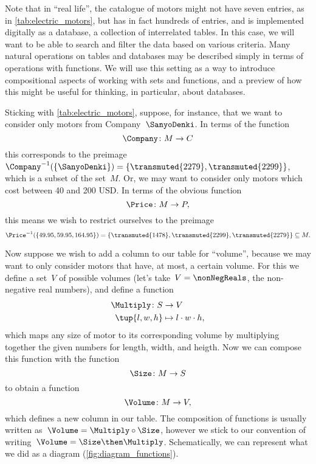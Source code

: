 Note that in ``real life'', the catalogue of motors might not have seven entries, as in \cref{tab:electric_motors}, but has in fact hundreds of entries, and is implemented digitally as a database, \text{\ie } a collection of interrelated tables. In this case, we will want to be able to search and filter the data based on various criteria. Many natural operations on tables and databases may be described simply in terms of operations with functions. We will use this setting as a way to introduce compositional aspects of working with sets and functions, and a preview of how this might be useful for thinking, in particular, about databases.

Sticking with \cref{tab:electric_motors}, suppose, for instance, that we want to consider only motors from Company~$\SanyoDenki$. In terms of the function
\begin{equation*}
  \Company\colon M \to C
\end{equation*}
this corresponds to the preimage~$\Company^{-1}(\{\SanyoDenki \}) = \{ \transmuted{2279}, \transmuted{2299}\}$, which is a subset of the set~$M$. Or, we may want to consider only motors which cost between 40 and 200 USD. In terms of the obvious function
\begin{equation*}
  \Price\colon M \to P,
\end{equation*}
this means we wish to restrict ourselves to the preimage
\begin{equation*}
  \Price^{-1}(\{ 49.95, 59.95, 164.95\}) = \{ \transmuted{1478}, \transmuted{2299}, \transmuted{2279} \} \subseteq M.
\end{equation*}

Now suppose we wish to add a column to our table for ``volume'', because we may want to only consider motors that have, at most, a certain volume.
For this we define a set~$V$ of possible volumes (let's take~$V = \nonNegReals$, the non-negative real numbers), and define a function
\begin{equation*}
  \begin{aligned}
    \Multiply \colon S &\to V\\
    \tup{l, w, h} &\mapsto l \cdot w \cdot h,
  \end{aligned}
\end{equation*}
which maps any size of motor to its corresponding volume by multiplying together the given numbers for length, width, and heigth. Now we can compose this function with the function
\begin{equation*}
  \Size \colon M \to S
\end{equation*}
to obtain a function
\begin{equation*}
  \Volume\colon M \to V,
\end{equation*}
which defines a new column in our table. The composition of functions is usually written as~$\Volume = \Multiply  \circ \Size $, however we stick to our convention of writing~$\Volume = \Size  \then \Multiply $. Schematically, we can represent what we did as a diagram (\cref{fig:diagram_functions}).

